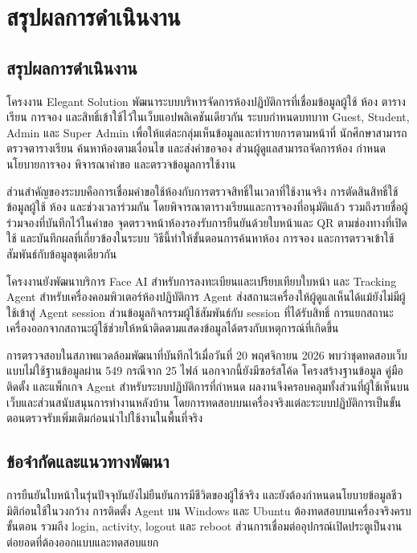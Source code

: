 \documentclass[14pt,a4paper,oneside]{extreport}
\begin{document}
\chapter{สรุปผลการดำเนินงาน}
\section{สรุปผลการดำเนินงาน}
โครงงาน Elegant Solution พัฒนาระบบบริหารจัดการห้องปฏิบัติการที่เชื่อมข้อมูลผู้ใช้ ห้อง ตารางเรียน การจอง และสิทธิ์เข้าใช้ไว้ในเว็บแอปพลิเคชันเดียวกัน ระบบกำหนดบทบาท Guest, Student, Admin และ Super Admin เพื่อให้แต่ละกลุ่มเห็นข้อมูลและทำรายการตามหน้าที่ นักศึกษาสามารถตรวจตารางเรียน ค้นหาห้องตามเงื่อนไข และส่งคำขอจอง ส่วนผู้ดูแลสามารถจัดการห้อง กำหนดนโยบายการจอง พิจารณาคำขอ และตรวจข้อมูลการใช้งาน

ส่วนสำคัญของระบบคือการเชื่อมคำขอใช้ห้องกับการตรวจสิทธิ์ในเวลาที่ใช้งานจริง การตัดสินสิทธิ์ใช้ข้อมูลผู้ใช้ ห้อง และช่วงเวลาร่วมกัน โดยพิจารณาตารางเรียนและการจองที่อนุมัติแล้ว รวมถึงรายชื่อผู้ร่วมจองที่บันทึกไว้ในคำขอ จุดตรวจหน้าห้องรองรับการยืนยันด้วยใบหน้าและ QR ตามช่องทางที่เปิดใช้ และบันทึกผลที่เกี่ยวข้องในระบบ วิธีนี้ทำให้ขั้นตอนการค้นหาห้อง การจอง และการตรวจเข้าใช้สัมพันธ์กับข้อมูลชุดเดียวกัน

โครงงานยังพัฒนาบริการ Face AI สำหรับการลงทะเบียนและเปรียบเทียบใบหน้า และ Tracking Agent สำหรับเครื่องคอมพิวเตอร์ห้องปฏิบัติการ Agent ส่งสถานะเครื่องให้ผู้ดูแลเห็นได้แม้ยังไม่มีผู้ใช้เข้าสู่ Agent session ส่วนข้อมูลกิจกรรมผู้ใช้สัมพันธ์กับ session ที่ได้รับสิทธิ์ การแยกสถานะเครื่องออกจากสถานะผู้ใช้ช่วยให้หน้าติดตามแสดงข้อมูลได้ตรงกับเหตุการณ์ที่เกิดขึ้น

การตรวจสอบในสภาพแวดล้อมพัฒนาที่บันทึกไว้เมื่อวันที่ 20 พฤศจิกายน 2026 พบว่าชุดทดสอบเว็บแบบไม่ใช้ฐานข้อมูลผ่าน 549 กรณีจาก 25 ไฟล์ นอกจากนี้ยังมีซอร์สโค้ด โครงสร้างฐานข้อมูล คู่มือติดตั้ง และแพ็กเกจ Agent สำหรับระบบปฏิบัติการที่กำหนด ผลงานจึงครอบคลุมทั้งส่วนที่ผู้ใช้เห็นบนเว็บและส่วนสนับสนุนการทำงานหลังบ้าน โดยการทดสอบบนเครื่องจริงแต่ละระบบปฏิบัติการเป็นขั้นตอนตรวจรับเพิ่มเติมก่อนนำไปใช้งานในพื้นที่จริง

\section{ข้อจำกัดและแนวทางพัฒนา}
การยืนยันใบหน้าในรุ่นปัจจุบันยังไม่ยืนยันการมีชีวิตของผู้ใช้จริง และยังต้องกำหนดนโยบายข้อมูลชีวมิติก่อนใช้ในวงกว้าง การติดตั้ง Agent บน Windows และ Ubuntu ต้องทดสอบบนเครื่องจริงครบขั้นตอน รวมถึง login, activity, logout และ reboot ส่วนการเชื่อมต่ออุปกรณ์เปิดประตูเป็นงานต่อยอดที่ต้องออกแบบและทดสอบแยก
\end{document}
